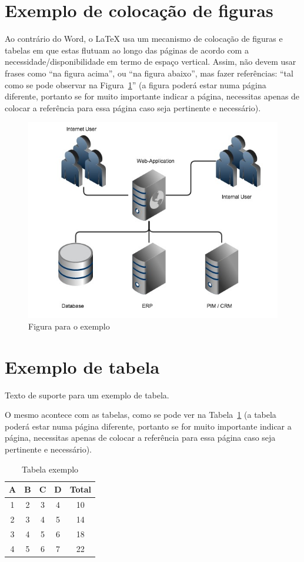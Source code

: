 \section{Exemplo de colocação de figuras}

Ao contrário do Word, o \LaTeX{} usa um mecanismo de colocação de figuras e tabelas em que estas flutuam ao longo das páginas de acordo com a necessidade/disponibilidade em termo de espaço vertical.
Assim, não devem usar frases como ``na figura acima'', ou ``na figura abaixo'', mas fazer referências:
``tal como se pode observar na Figura~\ref{fig:1}'' (a figura poderá estar numa página diferente, portanto se for muito importante indicar a página, necessitas apenas de colocar a referência para essa página \pageref{fig:1} caso seja pertinente e necessário).

\begin{figure}[htb]
	\centering
	\includegraphics[width=0.8\linewidth]{img/sample}  %
	\caption{Figura para o exemplo}
	\label{fig:1}
\end{figure}


\section{Exemplo de tabela}
Texto de suporte para um exemplo de tabela.

O mesmo acontece com as tabelas, como se pode ver na Tabela~\ref{tab:1} (a tabela poderá estar numa página diferente, portanto se for muito importante indicar a página, necessitas apenas de colocar a referência para essa página \pageref{tab:1} caso seja pertinente e necessário).

\begin{table}[htb]
	\centering
	\begin{tabular}{ccccc}
		\toprule
		\textbf{A} & \textbf{B} & \textbf{C} & \textbf{D} & \textbf{Total} \\
		\midrule
		1 & 2 & 3 & 4 & 10  \\
		2 & 3 & 4 & 5 & 14  \\
		3 & 4 & 5 & 6 & 18  \\
		4 & 5 & 6 & 7 & 22  \\
		\bottomrule
	\end{tabular}
	\caption{Tabela exemplo}
	\label{tab:1}
\end{table}


